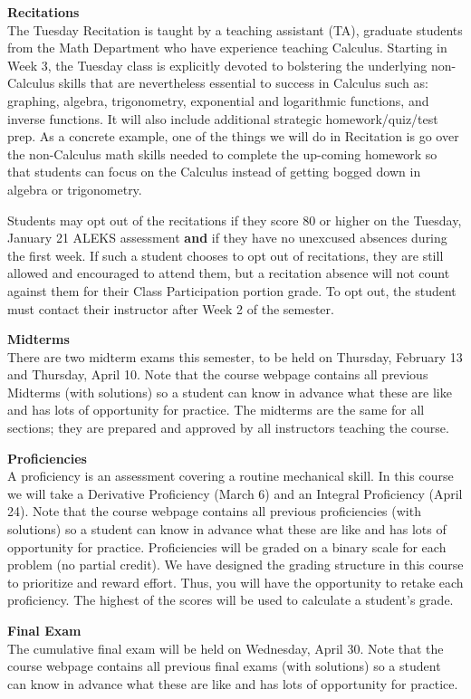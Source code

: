 \documentclass[12pt]{article}
\renewcommand{\emph}[1]{\textsf{\textbf{#1}}}
\newcommand{\localhead}[1]{\par\smallskip\textbf{#1}\nobreak\\}%
\def\heading#1{\localhead{\large\emph{#1}}}
\begin{document}
\heading{Recitations}
The Tuesday Recitation is taught by a teaching assistant (TA), graduate students from the Math  Department who have experience teaching Calculus. Starting in Week 3, the Tuesday class is explicitly devoted to bolstering the underlying non-Calculus skills that are nevertheless essential to success in Calculus such as: graphing, algebra, trigonometry, exponential and logarithmic functions, and inverse functions. It will also include additional strategic homework/quiz/test prep. As a concrete example, one of the things we will do in Recitation is go over the non-Calculus math skills needed to complete the up-coming homework so that students can focus on the Calculus instead of getting bogged down in algebra or trigonometry.

Students may opt out of the recitations if they score 80 or higher on the Tuesday, January 21 ALEKS assessment \textbf{and} if they have no unexcused absences during the first week. If such a student chooses to opt out of recitations, they are still allowed and encouraged to attend them, but a recitation absence will not count against them for their Class Participation portion grade. To opt out, the student must contact their instructor after Week 2 of the semester.

\heading{Midterms}
There are two midterm exams this semester, to be held on Thursday, February 13 and Thursday, April 10. Note that the course webpage contains all previous Midterms (with solutions) so a student can know in advance what these are like and has lots of opportunity for practice. The midterms are the same 
for all sections; they are prepared and approved by all instructors teaching the course. 

\heading{Proficiencies}
A proficiency is an assessment covering a routine mechanical skill.  In this course we will take a Derivative Proficiency (March 6) and an Integral Proficiency (April 24). Note that the course webpage contains all previous proficiencies (with solutions) so a student can know in advance what these are like and has lots of opportunity for practice. Proficiencies will be graded on a binary scale for each problem (no partial credit). We have designed the grading structure in this course to prioritize and reward effort. Thus, you will have the opportunity to retake each proficiency. The highest of the scores will be used to calculate a student's grade. 

\pagebreak

\heading{Final Exam} 
The cumulative final exam will be held on Wednesday, April 30. Note
that the course webpage contains all previous final exams (with
solutions) so a student can know in advance what these are like and
has lots of opportunity for practice.
\end{document}
